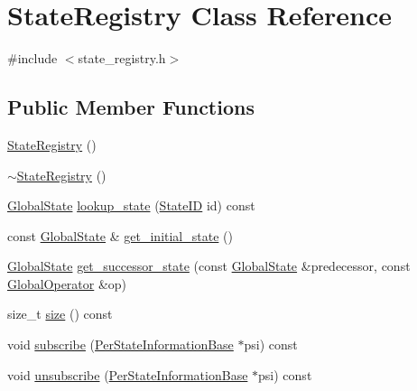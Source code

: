 \hypertarget{classStateRegistry}{\section{State\-Registry Class Reference}
\label{classStateRegistry}
}


{\ttfamily \#include $<$state\-\_\-registry.\-h$>$}

\subsection*{Public Member Functions}
\begin{DoxyCompactItemize}
\item 
\hyperlink{classStateRegistry_a81b0e3494cbbb5bbc412841d620d2668}{State\-Registry} ()
\item 
\hyperlink{classStateRegistry_aba4d24f370f47c7db0855aee7e51e62d}{$\sim$\-State\-Registry} ()
\item 
\hyperlink{classGlobalState}{Global\-State} \hyperlink{classStateRegistry_ae2f555f6a879115edb9e0045169730a6}{lookup\-\_\-state} (\hyperlink{classStateID}{State\-I\-D} id) const 
\item 
const \hyperlink{classGlobalState}{Global\-State} \& \hyperlink{classStateRegistry_ab557f312201e32d5de2b6ccf7ef6df87}{get\-\_\-initial\-\_\-state} ()
\item 
\hyperlink{classGlobalState}{Global\-State} \hyperlink{classStateRegistry_af6ec9371ef06ba1031e705cf538e40ca}{get\-\_\-successor\-\_\-state} (const \hyperlink{classGlobalState}{Global\-State} \&predecessor, const \hyperlink{classGlobalOperator}{Global\-Operator} \&op)
\item 
size\-\_\-t \hyperlink{classStateRegistry_a4e437b21bc89d14db1d501bb03c545a9}{size} () const 
\item 
void \hyperlink{classStateRegistry_a962e7b5b4024a5334cc9f14ee2c02f42}{subscribe} (\hyperlink{classPerStateInformationBase}{Per\-State\-Information\-Base} $\ast$psi) const 
\item 
void \hyperlink{classStateRegistry_a8d99889e5ff3a3de7739558751d94437}{unsubscribe} (\hyperlink{classPerStateInformationBase}{Per\-State\-Information\-Base} $\ast$psi) const 
\end{DoxyCompactItemize}


